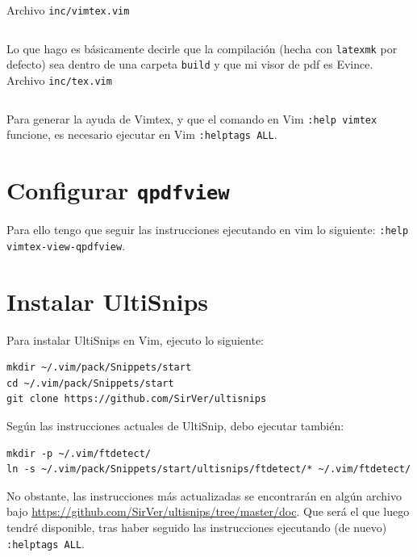 \documentclass{article}
\begin{document}
    Archivo \texttt{inc/vimtex.vim}

    \inputminted[breaklines, breakanywhere, breaksymbolleft="", breaksymbolright="", breakanywheresymbolpre="", breakanywheresymbolpost=""]
    {vim}{inc/vimtex.vim}

    Lo que hago es básicamente decirle que la compilación (hecha con \texttt{latexmk} por defecto) sea dentro de una carpeta \texttt{build} y que mi visor de pdf es Evince.
    Archivo \texttt{inc/tex.vim}
    
    \inputminted[breaklines, breakanywhere, breaksymbolleft="", breaksymbolright="", breakanywheresymbolpre="", breakanywheresymbolpost=""]
    {vim}{inc/tex.vim}

    Para generar la ayuda de Vimtex, y que el comando en Vim \texttt{:help vimtex} funcione, es necesario ejecutar en Vim \texttt{:helptags ALL}.

    \clearpage
    
    \section{Configurar \texttt{qpdfview}}
    Para ello tengo que seguir las instrucciones ejecutando en vim lo siguiente:
    \texttt{:help vimtex-view-qpdfview}.

    \section{Instalar UltiSnips}
    Para instalar UltiSnips en Vim, ejecuto lo siguiente:

    \begin{verbatim}
mkdir ~/.vim/pack/Snippets/start
cd ~/.vim/pack/Snippets/start
git clone https://github.com/SirVer/ultisnips
    \end{verbatim}

    Según las instrucciones actuales de UltiSnip, debo ejecutar también:

    \begin{verbatim}
mkdir -p ~/.vim/ftdetect/
ln -s ~/.vim/pack/Snippets/start/ultisnips/ftdetect/* ~/.vim/ftdetect/
    \end{verbatim}

    No obstante, las instrucciones más actualizadas se encontrarán en algún archivo bajo \href{https://github.com/SirVer/ultisnips/tree/master/doc}{https://github.com/Si\-rVer/ultisnips/tree/master/doc}. Que será el que luego tendré disponible, tras haber seguido las instrucciones ejecutando (de nuevo) \texttt{:helptags ALL}.
\end{document}
